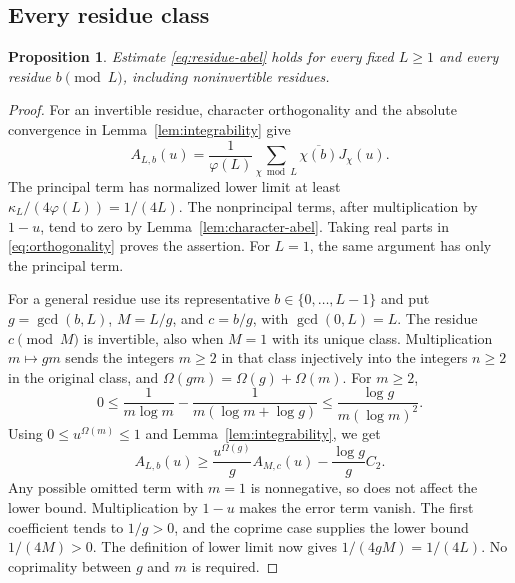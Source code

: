 \documentclass[11pt,reqno]{amsart}
\newtheorem{proposition}[theorem]{Proposition}
\theoremstyle{definition}
\theoremstyle{remark}
\numberwithin{equation}{section}
\newcommand{\Om}{\Omega}
\begin{document}
\subsection{Every residue class}

\begin{proposition}\label{prop:residues}
Estimate \eqref{eq:residue-abel} holds for every fixed $L\geq1$ and every
residue $b\pmod L$, including noninvertible residues.
\end{proposition}

\begin{proof}
For an invertible residue, character orthogonality and the absolute
convergence in Lemma~\ref{lem:integrability} give
\begin{equation}\label{eq:orthogonality}
 A_{L,b}(u)=\frac1{\varphi(L)}
       \sum_{\chi\bmod L}\overline{\chi(b)}J_\chi(u).
\end{equation}
The principal term has normalized lower limit at least
$\kappa_L/(4\varphi(L))=1/(4L)$. The nonprincipal terms, after
multiplication by $1-u$, tend to zero by
Lemma~\ref{lem:character-abel}. Taking real parts in
\eqref{eq:orthogonality} proves the assertion. For $L=1$, the same
argument has only the principal term.

For a general residue use its representative $b\in\{0,\ldots,L-1\}$
and put $g=\gcd(b,L)$, $M=L/g$, and $c=b/g$, with $\gcd(0,L)=L$.
The residue $c\pmod M$ is invertible, also when $M=1$ with its unique
class. Multiplication $m\mapsto gm$ sends the integers $m\geq2$ in
that class injectively into the integers $n\geq2$ in the original
class, and $\Om(gm)=\Om(g)+\Om(m)$. For $m\geq2$,
\begin{equation}\label{eq:log-shift}
 0\leq\frac1{m\log m}-\frac1{m(\log m+\log g)}
 \leq\frac{\log g}{m(\log m)^2}.
\end{equation}
Using $0\leq u^{\Om(m)}\leq1$ and Lemma~\ref{lem:integrability}, we get
\begin{equation}\label{eq:residue-scaling}
 A_{L,b}(u)\geq\frac{u^{\Om(g)}}g A_{M,c}(u)
                    -\frac{\log g}{g}C_2.
\end{equation}
Any possible omitted term with $m=1$ is nonnegative, so does not affect
the lower bound. Multiplication by $1-u$ makes the error term vanish.
The first coefficient tends to $1/g>0$, and the coprime case supplies
the lower bound $1/(4M)>0$. The definition of lower limit now gives
$1/(4gM)=1/(4L)$. No coprimality between $g$ and $m$ is required.
\end{proof}
\end{document}
